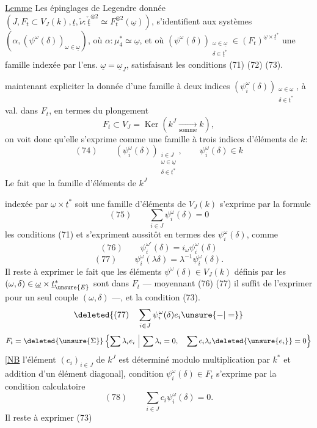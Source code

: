 \uline{Lemme} Les épinglages de Legendre 
donnée $(J,F_t\subset V_J(k),\underline t,\check\nu:\check{\underline t}^{\otimes2}\simeq F_t^{\otimes2}(\underline\omega))$,
s'identifient aux systèmes $(\alpha,(\psi^\omega(\delta))_{\omega\in\underline\omega})$, où
$\alpha:\mu_4^*\simeq\underline\omega$, et où
$(\psi^\omega(\delta))_{\substack{\omega\in\underline\omega\\\delta\in\underline t^*}}\in(F_t)^{\underline\omega\times\underline t^*}$
une famille indexée par l'ens. 
 $\underline\omega=\underline\omega_J$, satisfaisant les conditions
(71) (72) (73).

  maintenant expliciter la
donnée d'une famille à deux indices
$(\psi_i^\omega(\delta))_{\substack{\omega\in\underline\omega\\\delta\in\underline t^*}}$, à val. dans $F_t$, en termes du
plongement
\[
F_t\subset V_J=\operatorname{Ker}(k^J\xrightarrow[\mathrm{somme}]{}k),
\]
on voit donc qu'elle s'exprime comme
une famille à trois indices d'éléments de $k$:
\[
(74)\qquad(\psi_i^\omega(\delta))_{\substack{i\in J\\\omega\in\underline\omega\\\delta\in\underline t^*}},\qquad\psi_i^\omega(\delta)\in k
\]
Le fait que la famille d'éléments \unsure{$\in$} de $k^J$

indexée par $\underline\omega\times\underline t^*$ soit une famille d'éléments
de $V_J(k)$ s'exprime par la formule
\[
(75)\qquad\sum_{i\in J}\psi_i^\omega(\delta)=0
\]
les  conditions (71) et  s'expriment
aussitôt en termes des $\psi_i^\omega(\delta)$, comme
\[
(76)\qquad\psi_i^{\omega'}(\delta)=i_\omega\psi_i^\omega(\delta)
\]
\[
(77)\qquad\psi_i^\omega(\lambda\delta)=\lambda^{-1}\psi_i^\omega(\delta).
\]
Il reste à exprimer le fait que les éléments
$\psi^\omega(\delta)\in V_J(k)$ définis par les $(\omega,\delta)\in\underline\omega\times\underline t_{\unsure{E}}^*$ sont
dans $F_t$ --- moyennant (76) (77) il suffit de
l'exprimer pour un seul couple $(\omega,\delta)$ ---,
et la condition (73).
\[
\deleted{(77)\quad\sum_{i\in J}\psi_i^\omega(\delta)e_i\unsure{-|=}}
\]
\[
F_t=\deleted{\unsure{\Sigma}}\left\{\sum\lambda_i e_i\ \middle|\ \sum\lambda_i=0,\quad
\sum c_i\lambda_i\deleted{\unsure{e_i}}=0\right\}
\]
[\uline{NB} l'élément $(c_i)_{i\in J}$ de \deleted{$\unsure{\Sigma}$}$k^J$ est déterminé
modulo multiplication par $k^*$ et addition d'un élément
diagonal],  condition $\psi_i^\omega(\delta)\in F_t$
s'exprime par la condition calculatoire
\[
(78)\qquad\sum_{i\in J}c_i\psi_i^\omega(\delta)=0.
\]
Il reste  à exprimer (73)


